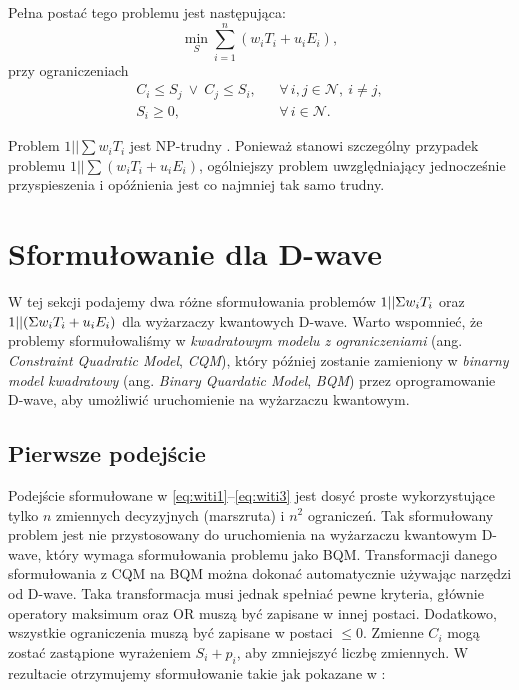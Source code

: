 Pełna postać tego problemu jest następująca:
\begin{equation}\label{eq:uiEi1}
    \min_S \sum_{i=1}^n (w_i T_i + u_i E_i),
\end{equation}
przy ograniczeniach
\begin{align}
    C_i \le S_j \ \vee \ C_j \le S_i,
    & & \forall\, i,j \in \mathcal{N},\ i \neq j, \label{eq:uiEi2} \\
    S_i \ge 0,
    & & \forall\, i \in \mathcal{N}. \label{eq:uiEi3}
\end{align}

Problem $1||\sum w_i T_i$ jest NP-trudny \cite{LENSTRA1977343}. Ponieważ
stanowi szczególny przypadek problemu $1||\sum (w_i T_i + u_i E_i)$,
ogólniejszy problem uwzględniający jednocześnie przyspieszenia i opóźnienia
jest co najmniej tak samo trudny.


\section{Sformułowanie dla D-wave}\label{sec:models}

W tej sekcji podajemy dwa różne sformułowania problemów $1||\Sigma{}w_i T_i$ oraz $1||(\Sigma{}w_i T_i+u_i E_i)$ dla wyżarzaczy kwantowych D-wave. Warto wspomnieć, że problemy sformułowaliśmy w \emph{kwadratowym modelu z ograniczeniami} (ang. \emph{Constraint Quadratic Model}, \emph{CQM}), który później zostanie zamieniony w \emph{binarny model kwadratowy} (ang. \emph{Binary Quardatic Model}, \emph{BQM}) przez oprogramowanie D-wave, aby umożliwić uruchomienie na wyżarzaczu kwantowym.

\subsection{Pierwsze podejście}

Podejście sformułowane w \eqref{eq:witi1}--\eqref{eq:witi3} jest dosyć proste wykorzystujące tylko $n$ zmiennych decyzyjnych (marszruta) i $n^2$ ograniczeń. Tak sformułowany problem jest nie przystosowany do uruchomienia na wyżarzaczu kwantowym D-wave, który wymaga sformułowania problemu jako BQM. Transformacji danego sformułowania z CQM na BQM można dokonać automatycznie używając narzędzi od D-wave. Taka transformacja musi jednak spełniać pewne kryteria, głównie operatory maksimum oraz OR muszą być zapisane w innej postaci. Dodatkowo, wszystkie ograniczenia muszą być zapisane w postaci $\leq{}0$. Zmienne $C_i$ mogą zostać zastąpione wyrażeniem $S_i+p_i$, aby zmniejszyć liczbę zmiennych. W rezultacie otrzymujemy sformułowanie takie jak pokazane w \cite{10703120}:

